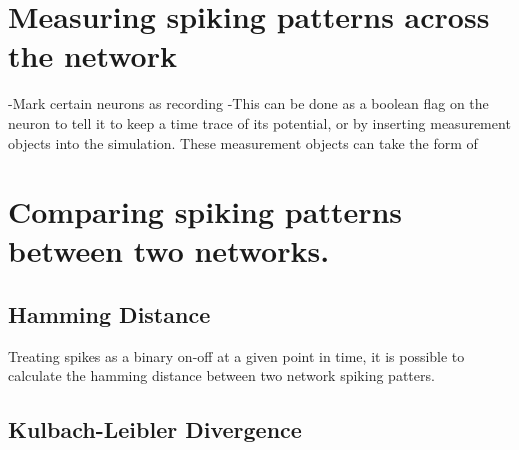 \section{Measuring spiking patterns across the network}

-Mark certain neurons as recording
-This can be done as a boolean flag on the neuron to tell it to keep a time
trace of its potential, or by inserting measurement objects into the simulation.
These measurement objects can take the form of 

\section{Comparing spiking patterns between two networks.}

\subsection{Hamming Distance}
Treating spikes as a binary on-off at a given point in time, it is possible to
calculate the hamming distance between two network spiking patters. 

\subsection{Kulbach-Leibler Divergence}
